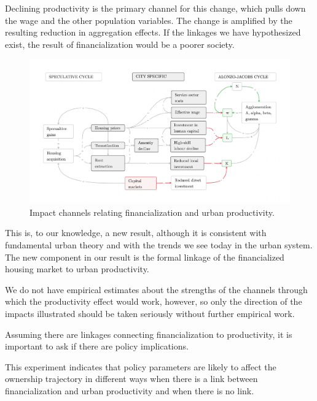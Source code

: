 Declining productivity is the primary channel for this change, which pulls down the wage and the other population variables. The change is amplified by the resulting reduction in aggregation effects.  If the linkages we have hypothesized exist, the result of financialization would be a poorer society. 


\begin{figure}[h!tb]\label{fig-impact-channels2}
\begin{adjustwidth}{-0.24\textwidth}{-0.24\textwidth}
\centering
\includegraphics[scale=.15 ]{fig/impact-channels.png}%
\end{adjustwidth}
\caption{Impact channels relating financialization and urban productivity.}
\end{figure}

This is, to our knowledge, a new result, although it is consistent with fundamental urban theory and with the trends we see today in the urban system. The new component in our result is the formal linkage of the financialized housing market to urban productivity.

We do not have empirical estimates about the strengths of the channels through which the productivity effect would work, however, so only the direction of the impacts illustrated should be taken seriously without further empirical work.  

Assuming there are linkages connecting financialization to productivity, it is important to ask if there are policy implications. 

This experiment indicates that policy parameters are likely to affect the ownership trajectory in different ways when there is a link between financialization and urban productivity and when there is no link.

